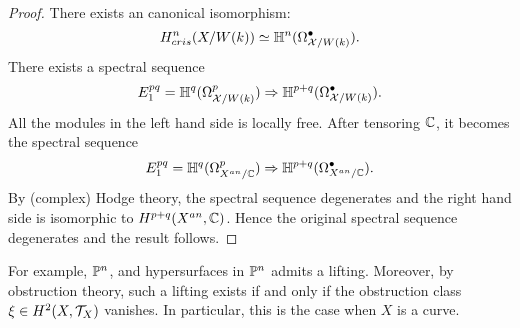 \begin{proof}
    There exists an canonical isomorphism:
    \[ 
        H^n_{cris}(X/W(k)) \simeq {\mathbb {H}}^n (\Omega_{{\mathcal {X}}/W(k)}^\bullet).
    \]
    There exists a spectral sequence 
    \[
        E_1^{pq} = {\mathbb {H}}^q(\Omega_{{\mathcal {X}}/W(k)}^p) 
        \Rightarrow {\mathbb {H}}^{p+q} (\Omega_{{\mathcal {X}}/W(k)}^\bullet).
    \]
    All the modules in the left hand side is locally free. 
    After tensoring ${\mathbb {C}}$, it becomes the spectral sequence
    \[
        E_1^{pq} = {\mathbb {H}}^q(\Omega_{X^{an}/{\mathbb {C}}}^p) 
        \Rightarrow {\mathbb {H}}^{p+q} (\Omega_{X^{an}/{\mathbb {C}}}^\bullet).
    \]
    By (complex) Hodge theory, the spectral sequence degenerates 
    and the right hand side is isomorphic to $H^{p+q} (X^{an},{\mathbb {C}})$. 
    Hence the original spectral sequence degenerates and the result follows.
\end{proof}
For example, ${\mathbb {P}}^n$, and hypersurfaces in ${\mathbb {P}}^n$ admits a lifting. 
Moreover, by obstruction theory, such a lifting exists if and only if 
the obstruction class $\xi \in H^2(X, {\mathcal {T}}_X)$ vanishes. 
In particular, this is the case when $X$ is a curve. 

